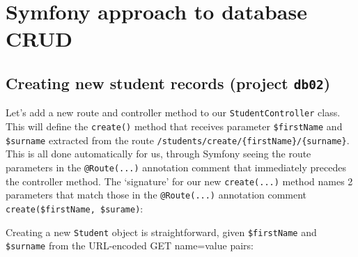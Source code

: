 \documentclass[a4paperpaper,openright]{book}
\newenvironment{Shaded}{}{}
\newcommand{\AnnotationTok}[1]{\textcolor[rgb]{0.38,0.63,0.69}{\textbf{\textit{#1}}}}
\newcommand{\CommentTok}[1]{\textcolor[rgb]{0.38,0.63,0.69}{\textit{#1}}}
\newcommand{\KeywordTok}[1]{\textcolor[rgb]{0.00,0.44,0.13}{\textbf{#1}}}
\newcommand{\NormalTok}[1]{#1}
\newcommand{\OtherTok}[1]{\textcolor[rgb]{0.00,0.44,0.13}{#1}}
\begin{document}
\hypertarget{symfony-approach-to-database-crud}{%
\chapter{Symfony approach to database
CRUD}\label{symfony-approach-to-database-crud}}

\hypertarget{creating-new-student-records-project-db02}{%
\section{\texorpdfstring{Creating new student records (project
\texttt{db02})}{Creating new student records (project db02)}}\label{creating-new-student-records-project-db02}}

Let's add a new route and controller method to our
\texttt{StudentController} class. This will define the \texttt{create()}
method that receives parameter \texttt{\$firstName} and
\texttt{\$surname} extracted from the route
\texttt{/students/create/\{firstName\}/\{surname\}}. This is all done
automatically for us, through Symfony seeing the route parameters in the
\texttt{@Route(...)} annotation comment that immediately precedes the
controller method. The `signature' for our new \texttt{create(...)}
method names 2 parameters that match those in the \texttt{@Route(...)}
annotation comment \texttt{create(\$firstName,\ \$surame)}:

\begin{Shaded}
\end{Shaded}

Creating a new \texttt{Student} object is straightforward, given
\texttt{\$firstName} and \texttt{\$surname} from the URL-encoded GET
name=value pairs:

\begin{Shaded}
\end{Shaded}
\end{document}
